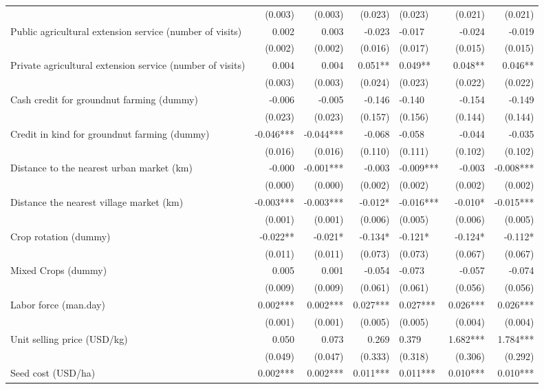\documentclass[
]{article}
\begin{document}
\begin{longtable}[t]{lrrrlrr}
\addlinespace
 & (0.003) & (0.003) & (0.023) & (0.023) & (0.021) & (0.021)\\
Public agricultural extension service (number of visits) & 0.002 & 0.003 & -0.023 & -0.017 & -0.024 & -0.019\\
 & (0.002) & (0.002) & (0.016) & (0.017) & (0.015) & (0.015)\\
Private agricultural extension service (number of visits) & 0.004 & 0.004 & 0.051** & 0.049** & 0.048** & 0.046**\\
 & (0.003) & (0.003) & (0.024) & (0.023) & (0.022) & (0.022)\\
\addlinespace
Cash credit for groundnut farming (dummy) & -0.006 & -0.005 & -0.146 & -0.140 & -0.154 & -0.149\\
 & (0.023) & (0.023) & (0.157) & (0.156) & (0.144) & (0.144)\\
Credit in kind for groundnut farming (dummy) & -0.046*** & -0.044*** & -0.068 & -0.058 & -0.044 & -0.035\\
 & (0.016) & (0.016) & (0.110) & (0.111) & (0.102) & (0.102)\\
Distance to the nearest urban market (km) & -0.000 & -0.001*** & -0.003 & -0.009*** & -0.003 & -0.008***\\
\addlinespace
 & (0.000) & (0.000) & (0.002) & (0.002) & (0.002) & (0.002)\\
Distance the nearest village market (km) & -0.003*** & -0.003*** & -0.012* & -0.016*** & -0.010* & -0.015***\\
 & (0.001) & (0.001) & (0.006) & (0.005) & (0.006) & (0.005)\\
Crop rotation (dummy) & -0.022** & -0.021* & -0.134* & -0.121* & -0.124* & -0.112*\\
 & (0.011) & (0.011) & (0.073) & (0.073) & (0.067) & (0.067)\\
\addlinespace
Mixed Crops (dummy) & 0.005 & 0.001 & -0.054 & -0.073 & -0.057 & -0.074\\
 & (0.009) & (0.009) & (0.061) & (0.061) & (0.056) & (0.056)\\
Labor force (man.day) & 0.002*** & 0.002*** & 0.027*** & 0.027*** & 0.026*** & 0.026***\\
 & (0.001) & (0.001) & (0.005) & (0.005) & (0.004) & (0.004)\\
Unit selling price (USD/kg) & 0.050 & 0.073 & 0.269 & 0.379 & 1.682*** & 1.784***\\
\addlinespace
 & (0.049) & (0.047) & (0.333) & (0.318) & (0.306) & (0.292)\\
Seed cost (USD/ha) & 0.002*** & 0.002*** & 0.011*** & 0.011*** & 0.010*** & 0.010***\\

\end{longtable}
\end{document}
